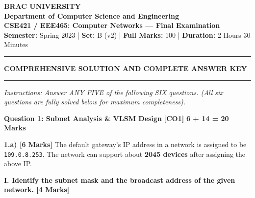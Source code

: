 \documentclass[11pt,a4paper]{article}
\newcommand{\questionheader}[3]{
    \vspace{0.35cm}
    \noindent\colorbox{qboxbg}{
        \parbox{\dimexpr\textwidth-2\fboxsep\relax}{
            \textbf{\textcolor{primary}{\large #1}} \hfill \textbf{\textcolor{accent}{[#2]}} \hfill \textbf{\textcolor{secondary}{#3 Marks}}
        }
    }
    \vspace{0.15cm}
}
\begin{document}
\begin{center}
    {\LARGE \textbf{\textcolor{primary}{BRAC UNIVERSITY}}}\\[4pt]
    {\large \textbf{Department of Computer Science and Engineering}}\\[3pt]
    {\textbf{CSE421 / EEE465: Computer Networks --- Final Examination}}\\[2pt]
    \textbf{Semester:} Spring 2023 \quad | \quad \textbf{Set:} B (v2) \quad | \quad \textbf{Full Marks:} 100 \quad | \quad \textbf{Duration:} 2 Hours 30 Minutes\\[2pt]
    \rule{\textwidth}{1.5pt}
    {\large \textbf{\textcolor{secondary}{COMPREHENSIVE SOLUTION AND COMPLETE ANSWER KEY}}}
    \rule{\textwidth}{0.8pt}
\end{center}

\textit{Instructions: Answer ANY FIVE of the following SIX questions. (All six questions are fully solved below for maximum completeness).}

\questionheader{Question 1: Subnet Analysis \& VLSM Design}{CO1}{6 + 14 = 20}

\textbf{1.a) [6 Marks]}
The default gateway's IP address in a network is assigned to be \texttt{109.0.8.253}. The network can support about \textbf{2045 devices} after assigning the above IP.

\textbf{I. Identify the subnet mask and the broadcast address of the given network. [4 Marks]}
\end{document}
